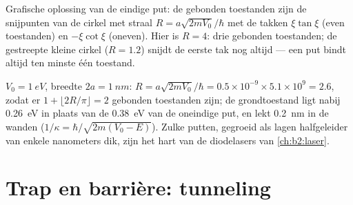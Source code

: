 \begin{omfigure}

{\small Grafische oplossing van de eindige put: de gebonden toestanden zijn
de snijpunten van de cirkel met straal $R = a\sqrt{2mV_0}/\hbar$ met
de takken $\xi\tan\xi$ (even toestanden) en $-\xi\cot\xi$ (oneven). Hier is
$R = 4$: drie gebonden toestanden; de gestreepte kleine cirkel ($R = 1.2$) snijdt
de eerste tak nog altijd --- een put bindt altijd ten minste één toestand.}
\end{omfigure}

\begin{example}\label{ex:b2:potential-wells-tunneling:finite}
$V_0 = \qty{1}{eV}$, breedte $2a = \qty{1}{nm}$:
$R = a\sqrt{2mV_0}/\hbar = 0.5 \times
10^{-9} \times 5.1 \times 10^9 = 2.6$,
zodat er $1 + \lfloor 2R/\pi\rfloor = 2$ gebonden
toestanden zijn; de grondtoestand ligt nabij \qty{0.26}{eV} in plaats van de
\qty{0.38}{eV} van de oneindige put, en lekt \qty{0.2}{nm} in de wanden
($1/\kappa = \hbar/\sqrt{2m(V_0 - E)}$). Zulke putten, gegroeid als lagen
halfgeleider van enkele nanometers dik, zijn het hart van de
diodelasers van \cref{ch:b2:laser}.
\end{example}

\section{Trap en barrière: tunneling}


